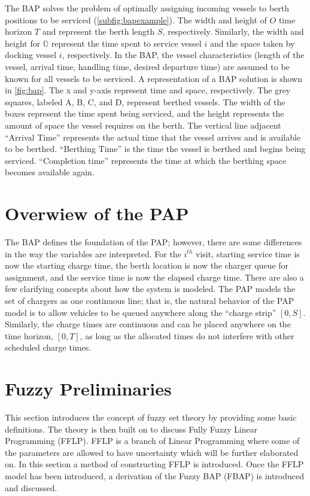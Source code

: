 \documentclass[ee,msthesis]{usuthesis}
\begin{document}
The BAP solves the problem of optimally assigning incoming vessels to berth positions to be serviced
(\autoref{subfig:bapexample}). The width and height of \(O\) time horizon \(T\) and represent the berth length \(S\),
respectively. Similarly, the width and height for \(\mathbb{O}\) represent the time spent to service vessel \(i\) and the
space taken by docking vessel \(i\), respectively. In the BAP, the vessel characteristics (length of the vessel, arrival
time, handling time, desired departure time) are assumed to be known for all vessels to be serviced. A representation of
a BAP solution is shown in \autoref{fig:bap}. The x and y-axis represent time and space, respectively. The grey squares,
labeled A, B, C, and D, represent berthed vessels. The width of the boxes represent the time spent being serviced, and
the height represents the amount of space the vessel requires on the berth. The vertical line adjacent
 ``Arrival Time'' represents the actual
time that the vessel arrives and is available to be berthed. ``Berthing Time'' is the time the vessel is berthed and
begins being serviced. ``Completion time'' represents the time at which the berthing space becomes available again.

\section{Overwiew of the PAP}
\label{sec:overview-of-the-pap}
The BAP defines the foundation of the PAP; however, there are some differences in the way the variables are interpreted. For
the \(i^{th}\) visit, starting service time is now the starting charge time, the berth location is now the charger queue
for assignment, and the service time is now the elapsed charge time. There are also a few clarifying concepts about how
the system is modeled. The PAP models the set of chargers as one continuous line; that is, the natural behavior of the
PAP model is to allow vehicles to be queued anywhere along the ``charge strip'' \([0,S]\). Similarly, the charge times are
continuous and can be placed anywhere on the time horizon, \([0,T]\), as long as the allocated times do not interfere with
other scheduled charge times.

\section{Fuzzy Preliminaries}
\label{sec:fuzzy-preliminaries}
This section introduces the concept of fuzzy set theory by providing some basic definitions. The theory is then built on
to discuss Fully Fuzzy Linear Programming (FFLP). FFLP is a branch of Linear Programming where some of the parameters
are allowed to have uncertainty which will be further elaborated on. In this section a method of constructing FFLP is
introduced. Once the FFLP model has been introduced, a derivation of the Fuzzy BAP (FBAP) is introduced and
discussed.
\end{document}
